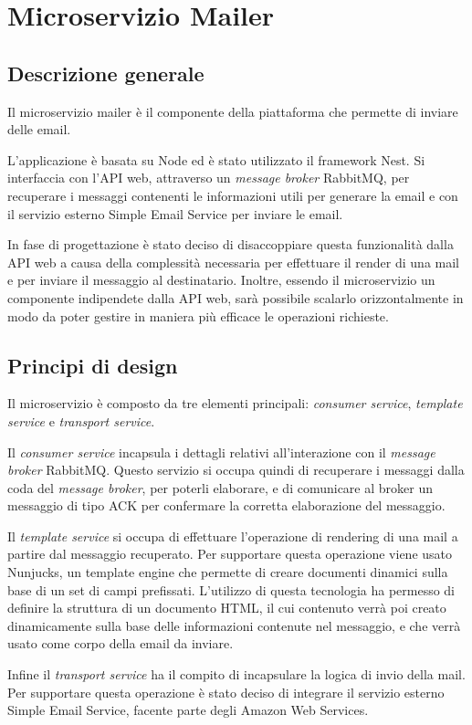 
\section{Microservizio Mailer}
\subsection{Descrizione generale}
Il microservizio mailer è il componente della piattaforma che permette di inviare delle email.

L'applicazione è basata su Node ed è stato utilizzato il framework Nest.
Si interfaccia con l'API web, attraverso un \textit{message broker} RabbitMQ, per recuperare i messaggi contenenti le informazioni utili per generare la email e con il servizio esterno Simple Email Service per inviare le email.

In fase di progettazione è stato deciso di disaccoppiare questa funzionalità dalla API web a causa della complessità necessaria per effettuare il render di una mail e per inviare il messaggio al destinatario.
Inoltre, essendo il microservizio un componente indipendete dalla API web, sarà possibile scalarlo orizzontalmente in modo da poter gestire in maniera più efficace le operazioni richieste.

\subsection{Principi di design}
Il microservizio è composto da tre elementi principali: \textit{consumer service}, \textit{template service} e \textit{transport service}.

Il \textit{consumer service} incapsula i dettagli relativi all'interazione con il \textit{message broker} RabbitMQ. Questo servizio si occupa quindi di recuperare i messaggi dalla coda del \textit{message broker}, per poterli elaborare, e di comunicare
al broker un messaggio di tipo ACK per confermare la corretta elaborazione del messaggio.

Il \textit{template service} si occupa di effettuare l'operazione di rendering di una mail a partire dal messaggio recuperato. Per supportare questa operazione viene usato Nunjucks, un template engine che permette di creare documenti dinamici
sulla base di un set di campi prefissati. L'utilizzo di questa tecnologia ha permesso di definire la struttura di un documento HTML, il cui contenuto verrà poi creato dinamicamente sulla base delle informazioni contenute nel messaggio, e che
verrà usato come corpo della email da inviare.

Infine il \textit{transport service} ha il compito di incapsulare la logica di invio della mail. Per supportare questa operazione è stato deciso di integrare il servizio esterno Simple Email Service, facente parte degli Amazon Web Services.
